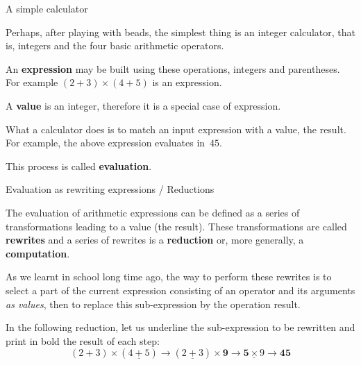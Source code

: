 \documentclass[compress,dvipdfmx]{beamer}
\begin{document}
%
\begin{frame}{A simple calculator}

  Perhaps, after playing with beads, the simplest thing is an integer
  calculator, that is, integers and the four basic arithmetic
  operators.

  \bigskip

  An \textbf{expression} may be built using these operations, integers
  and parentheses. For example \((2+3)\times(4+5)\) is an expression.

  \bigskip

  A \textbf{value}  is an integer, therefore  it is a special  case of
  expression.

  \bigskip

  What a calculator does is to match an input expression with a value,
  the result. For example, the above expression evaluates in~\(45\).

  \bigskip

  This process is called \textbf{evaluation}.

\end{frame}

%
\begin{frame}{Evaluation as rewriting expressions / Reductions}

  The evaluation of arithmetic expressions can be defined as a series
  of transformations leading to a value (the result). These
  transformations are called \textbf{rewrites} and a series of
  rewrites is a \textbf{reduction} or, more generally, a
  \textbf{computation}.

  \bigskip

  As we learnt in school long time ago, the way to perform these
  rewrites is to select a part of the current expression consisting of
  an operator and its arguments \emph{as values}, then to replace this
  sub-expression by the operation result.

  \bigskip

  In the following reduction, let us underline the sub-expression to
  be rewritten and print in bold the result of each step:
  \begin{equation*}
    (2+3) \times (\underline{4+5}) \rightarrow (\underline{2+3})
    \times \textbf{9} \rightarrow \underline{\textbf{5} \times 9}
    \rightarrow \textbf{45}
  \end{equation*}

\end{frame}
\end{document}
